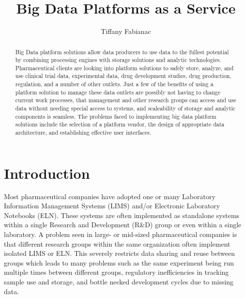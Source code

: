 \documentclass[sigconf]{acmart}
\begin{document}
\title{Big Data Platforms as a Service}


\author{Tiffany Fabianac}
\orcid{}

\renewcommand{\shortauthors}{T. Fabianac}


\begin{abstract}
Big Data platform solutions allow data producers to use data to the fullest potential by combining processing engines with storage solutions and analytic technologies. Pharmaceutical clients are looking into platform solutions to safely store, analyze, and use clinical trial data, experimental data, drug development studies, drug production, regulation, and a number of other outlets. Just a few of the benefits of using a platform solution to manage these data outlets are possibly not having to change current work processes, that management and other research groups can access and use data without needing special access to systems, and scaleability of storage and analytic components is seamless. The problems faced to implementing big data platform solutions include the selection of a platform vendor, the design of appropriate data architecture, and establishing effective user interfaces.
\end{abstract}



\maketitle


\section{Introduction}
Most pharmaceutical companies have adopted one or many Laboratory Information Management Systems (LIMS) and/or Electronic Laboratory Notebooks (ELN). These systems are often implemented as standalone systems within a single Research and Development (R\&D) group or even within a single laboratory. A problem seen in large- or mid-sized pharmaceutical companies is that different research groups within the same organization often implement isolated LIMS or ELN. This severely restricts data sharing and reuse between groups which leads to many problems such as the same experiment being run multiple times between different groups, regulatory inefficiencies in tracking sample use and storage, and bottle necked development cycles due to missing data. 
\end{document}
